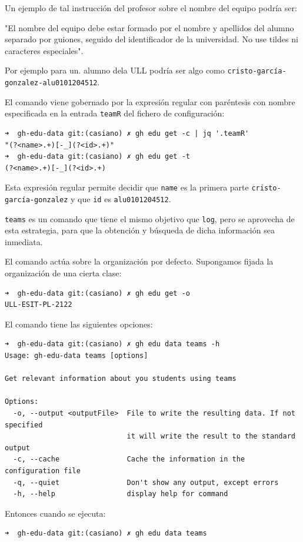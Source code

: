 Un ejemplo de tal instrucción del profesor sobre el nombre del equipo podría ser: 

"El nombre del equipo debe estar formado por el nombre y apellidos del alumno separado por guiones, seguido del identificador de la universidad. No use tildes ni caracteres especiales".

Por ejemplo para un. alumno dela ULL podría ser algo como \verb|cristo-garcía-gonzalez-alu0101204512|. 

El comando viene gobernado por la expresión regular con paréntesis con nombre 
especificada en la entrada \verb|teamR| del fichero de configuración:
\begin{verbatim}
➜  gh-edu-data git:(casiano) ✗ gh edu get -c | jq '.teamR'
"(?<name>.+)[-_](?<id>.+)"
➜  gh-edu-data git:(casiano) ✗ gh edu get -t
(?<name>.+)[-_](?<id>.+)
\end{verbatim}
Esta expresión regular permite decidir que \verb|name| es la primera parte \verb|cristo-garcía-gonzalez| y que \verb|id| es \verb|alu0101204512|.

\verb|teams| es un comando que tiene el mismo objetivo que \verb|log|, pero se aprovecha de esta estrategia, para que la obtención y búsqueda de dicha información sea inmediata.

El comando actúa sobre la organización por defecto. 
Supongamos fijada la organización de una cierta clase:

\begin{verbatim}
➜  gh-edu-data git:(casiano) ✗ gh edu get -o
ULL-ESIT-PL-2122
\end{verbatim}

El comando tiene las siguientes opciones:

\begin{verbatim}
➜  gh-edu-data git:(casiano) ✗ gh edu data teams -h
Usage: gh-edu-data teams [options]

Get relevant information about you students using teams

Options:
  -o, --output <outputFile>  File to write the resulting data. If not specified
                             it will write the result to the standard output
  -c, --cache                Cache the information in the configuration file
  -q, --quiet                Don't show any output, except errors
  -h, --help                 display help for command
\end{verbatim}

Entonces cuando se ejecuta:

\begin{verbatim}
➜  gh-edu-data git:(casiano) ✗ gh edu data teams
\end{verbatim}

